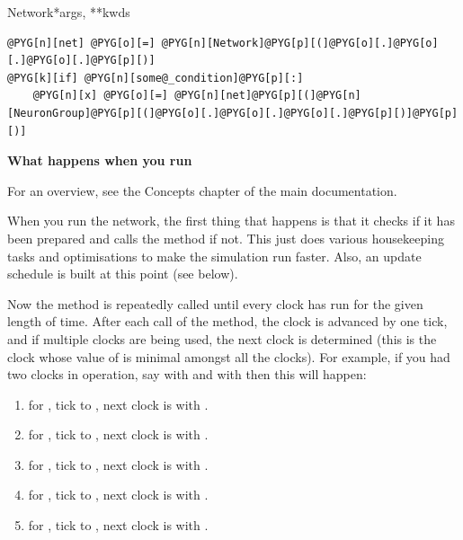 \documentclass[letterpaper,10pt,english]{manual}
\begin{document}
\begin{classdesc}{Network}{*args, **kwds}
\begin{description}
\begin{Verbatim}[commandchars=@\[\]]
@PYG[n][net] @PYG[o][=] @PYG[n][Network]@PYG[p][(]@PYG[o][.]@PYG[o][.]@PYG[o][.]@PYG[p][)]
@PYG[k][if] @PYG[n][some@_condition]@PYG[p][:]
    @PYG[n][x] @PYG[o][=] @PYG[n][net]@PYG[p][(]@PYG[n][NeuronGroup]@PYG[p][(]@PYG[o][.]@PYG[o][.]@PYG[o][.]@PYG[p][)]@PYG[p][)]
\end{Verbatim}

\end{description}

\textbf{What happens when you run}

For an overview, see the Concepts chapter of the main documentation.

When you run the network, the first thing that happens is that it
checks if it has been prepared and calls the  method
if not. This just does various housekeeping tasks and optimisations
to make the simulation run faster. Also, an update schedule is
built at this point (see below).

Now the  method is repeatedly called until every clock
has run for the given length of time. After each call of the
 method, the clock is advanced by one tick, and if
multiple clocks are being used, the next clock is determined (this
is the clock whose value of  is minimal amongst all the clocks).
For example, if you had two clocks in operation, say  with
 and  with  then this will happen:
\begin{enumerate}
\item {} 
 for , tick  to , next
clock is  with .

\item {} 
 for , tick  to , next
clock is  with .

\item {} 
 for , tick  to , next
clock is  with .

\item {} 
 for , tick  to , next
clock is  with .

\item {} 
 for , tick  to , next
clock is  with .


\end{enumerate}
\end{classdesc}
\end{document}
